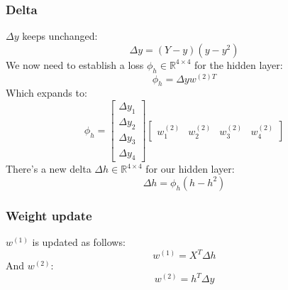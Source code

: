 \documentclass[10pt,a4paper]{article}
\begin{document}
\subsubsection{Delta}
$\Delta{y}$ keeps unchanged:
\begin{equation}
	\Delta{y} = (Y-y)(y-y^2)
\end{equation}
We now need to establish a loss $\phi_h \in \mathbb{R}^{4 \times 4}$ for the hidden layer:
\begin{equation}
	\phi_h = \Delta{y}w^{(2)T}
\end{equation}
Which expands to:
\begin{equation}
	\phi_h =
	\begin{bmatrix}
		\Delta{y_1} \\
		\Delta{y_2} \\
		\Delta{y_3} \\
		\Delta{y_4}
	\end{bmatrix}
	\begin{bmatrix}
		w^{(2)}_{1} & w^{(2)}_{2} & w^{(2)}_{3} & w^{(2)}_{4}
	\end{bmatrix}
\end{equation}
There's a new delta $\Delta{h} \in \mathbb{R}^{4 \times 4}$ for our hidden layer:
\begin{equation}
	\Delta{h} = \phi_h (h-h^2)
\end{equation}

\subsubsection{Weight update}
$w^{(1)}$ is updated as follows:
\begin{equation}
	w^{(1)} = X^T\Delta{h}
\end{equation}
And $w^{(2)}$:
\begin{equation}
	w^{(2)} = h^T\Delta{y}
\end{equation}
\end{document}
